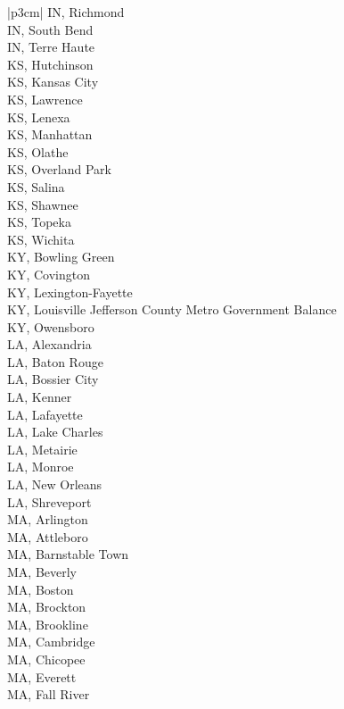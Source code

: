 \begin{customLongTable}{ |p{3cm}| }
IN, Richmond \\ \hline
IN, South Bend \\ \hline
IN, Terre Haute \\ \hline
KS, Hutchinson \\ \hline
KS, Kansas City \\ \hline
KS, Lawrence \\ \hline
KS, Lenexa \\ \hline
KS, Manhattan \\ \hline
KS, Olathe \\ \hline
KS, Overland Park \\ \hline
KS, Salina \\ \hline
KS, Shawnee \\ \hline
KS, Topeka \\ \hline
KS, Wichita \\ \hline
KY, Bowling Green \\ \hline
KY, Covington \\ \hline
KY, Lexington-Fayette \\ \hline
KY, Louisville Jefferson County Metro Government Balance \\ \hline
KY, Owensboro \\ \hline
LA, Alexandria \\ \hline
LA, Baton Rouge \\ \hline
LA, Bossier City \\ \hline
LA, Kenner \\ \hline
LA, Lafayette \\ \hline
LA, Lake Charles \\ \hline
LA, Metairie \\ \hline
LA, Monroe \\ \hline
LA, New Orleans \\ \hline
LA, Shreveport \\ \hline
MA, Arlington \\ \hline
MA, Attleboro \\ \hline
MA, Barnstable Town \\ \hline
MA, Beverly \\ \hline
MA, Boston \\ \hline
MA, Brockton \\ \hline
MA, Brookline \\ \hline
MA, Cambridge \\ \hline
MA, Chicopee \\ \hline
MA, Everett \\ \hline
MA, Fall River \\ \hline

\end{customLongTable}
